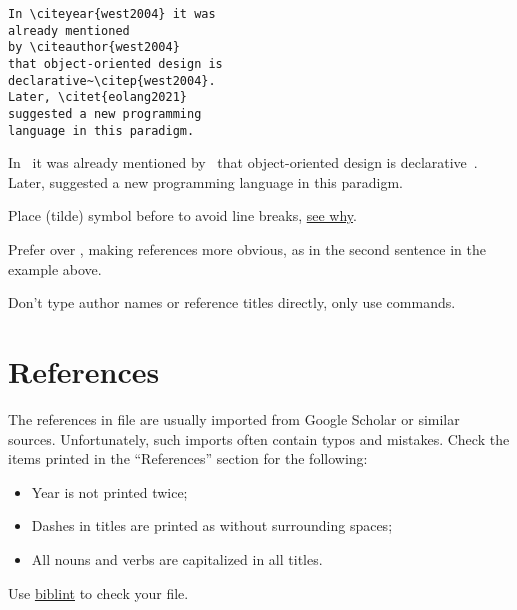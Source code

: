 \documentclass[12pt,nonacm,natbib=false]{acmart}
\begin{document}
\begin{multicols}{2}
\setlength{\parskip}{0pt}
\small
\raggedcolumns
\begin{verbatim}
In \citeyear{west2004} it was
already mentioned
by \citeauthor{west2004}
that object-oriented design is
declarative~\citep{west2004}.
Later, \citet{eolang2021}
suggested a new programming
language in this paradigm.
\end{verbatim}

\columnbreak

\raggedright
In~\citeyear{west2004} it was already
mentioned by~\citeauthor{west2004} that
object-oriented design is
declarative~\citep{west2004}.
Later, \citet{eolang2021}
suggested a new programming
language in this paradigm.

\AtNextBibliography{\small}
\setlength\bibitemsep{3pt}
{\raggedright\printbibliography[heading=none]}
\end{multicols}

Place \ff{\~} (tilde) symbol before  to avoid line breaks, \href{https://tex.stackexchange.com/questions/41264/what-is-the-difference-in-citing-referencing-with-or-without-tilde}{see why}.

Prefer  over , making references more obvious, as in the second sentence in the example above.

Don't type author names or reference titles directly, only use  commands.

\section{References}

The references in  file are usually imported from Google Scholar or similar sources. Unfortunately, such imports often contain typos and mistakes. Check the items printed in the ``References'' section for the following:

\begin{itemize}
    \item Year is not printed twice;
    \item Dashes in titles are printed as \ff{-{}-{}-} without surrounding spaces;
    \item All nouns and verbs are capitalized in all titles.
\end{itemize}

Use \href{https://github.com/Kingsford-Group/biblint}{biblint} to check your  file.
\end{document}
